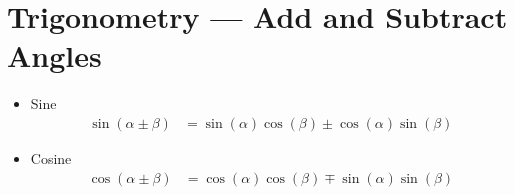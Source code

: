 \section{Trigonometry --- Add and Subtract Angles}\label{sec trig add}
\begin{itemize}
 \item Sine
\begin{align*}
  \sin(\alpha \pm \beta) &= \sin(\alpha)\cos(\beta) \pm \cos(\alpha)\sin(\beta)
  \end{align*}
 \item Cosine
\begin{align*}
  \cos(\alpha \pm \beta) &= \cos(\alpha)\cos(\beta) \mp \sin(\alpha)\sin(\beta)
\end{align*}

\end{itemize}

